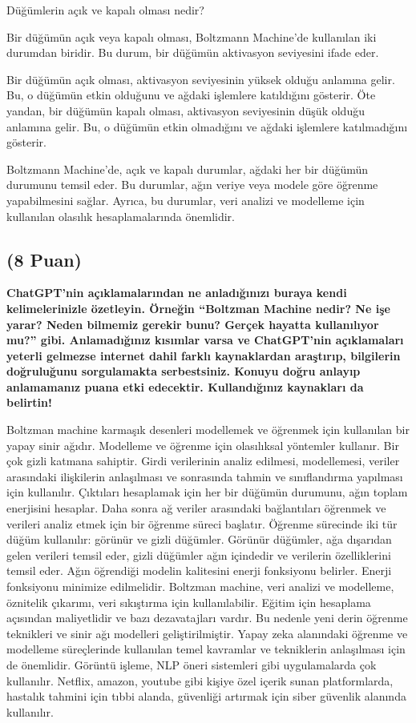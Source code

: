 \documentclass[11pt]{article}
\begin{document}
Düğümlerin açık ve kapalı olması nedir?

Bir düğümün açık veya kapalı olması, Boltzmann Machine'de kullanılan iki durumdan biridir. Bu durum, bir düğümün aktivasyon seviyesini ifade eder.

Bir düğümün açık olması, aktivasyon seviyesinin yüksek olduğu anlamına gelir. Bu, o düğümün etkin olduğunu ve ağdaki işlemlere katıldığını gösterir. Öte yandan, bir düğümün kapalı olması, aktivasyon seviyesinin düşük olduğu anlamına gelir. Bu, o düğümün etkin olmadığını ve ağdaki işlemlere katılmadığını gösterir.

Boltzmann Machine'de, açık ve kapalı durumlar, ağdaki her bir düğümün durumunu temsil eder. Bu durumlar, ağın veriye veya modele göre öğrenme yapabilmesini sağlar. Ayrıca, bu durumlar, veri analizi ve modelleme için kullanılan olasılık hesaplamalarında önemlidir.



\subsection{(8 Puan)} \textbf{ChatGPT’nin açıklamalarından ne anladığınızı buraya kendi kelimelerinizle özetleyin. Örneğin ``Boltzman Machine nedir? Ne işe yarar? Neden bilmemiz gerekir bunu? Gerçek hayatta kullanılıyor mu?'' gibi. Anlamadığınız kısımlar varsa ve ChatGPT’nin açıklamaları yeterli gelmezse internet dahil farklı kaynaklardan araştırıp, bilgilerin doğruluğunu sorgulamakta serbestsiniz. Konuyu doğru anlayıp anlamamanız puana etki edecektir. Kullandığınız kaynakları da belirtin!}

Boltzman machine karmaşık desenleri modellemek ve öğrenmek için kullanılan bir yapay sinir ağıdır. Modelleme ve öğrenme için olasılıksal yöntemler kullanır. Bir çok gizli katmana sahiptir. Girdi verilerinin analiz edilmesi, modellemesi, veriler arasındaki ilişkilerin anlaşılması ve sonrasında tahmin ve sınıflandırma yapılması için kullanılır. Çıktıları hesaplamak için her bir düğümün durumunu, ağın toplam enerjisini hesaplar. Daha sonra ağ veriler arasındaki bağlantıları öğrenmek ve verileri analiz etmek için bir öğrenme süreci başlatır. Öğrenme sürecinde iki tür düğüm kullanılır: görünür ve gizli düğümler. Görünür düğümler, ağa dışarıdan gelen verileri temsil eder, gizli düğümler ağın içindedir ve verilerin özelliklerini temsil eder. Ağın öğrendiği modelin kalitesini enerji fonksiyonu belirler. Enerji fonksiyonu minimize edilmelidir.
Boltzman machine, veri analizi ve modelleme, öznitelik çıkarımı, veri sıkıştırma için kullanılabilir. Eğitim için hesaplama açısından maliyetlidir ve bazı dezavatajları vardır. Bu nedenle yeni derin öğrenme teknikleri ve sinir ağı modelleri geliştirilmiştir.
Yapay zeka alanındaki öğrenme ve modelleme süreçlerinde kullanılan temel kavramlar ve tekniklerin anlaşılması için de önemlidir. 
Görüntü işleme, NLP öneri sistemleri gibi uygulamalarda çok kullanılır. Netflix, amazon, youtube gibi kişiye özel içerik sunan platformlarda, hastalık tahmini için tıbbi alanda, güvenliği artırmak için siber güvenlik alanında kullanılır. 
\end{document}
